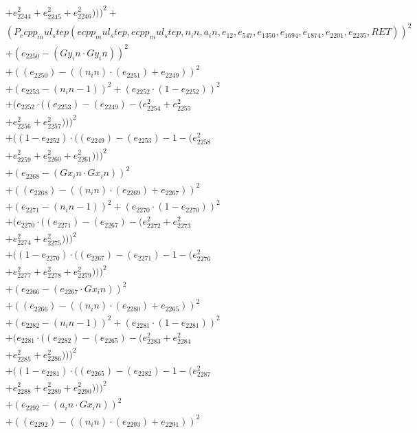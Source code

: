 \documentclass[10pt, a4paper]{article}
\begin{document}
\begin{small}
\begin{align*}
& + e_{2244}^{2} + e_{2245}^{2} + e_{2246}^{2})))^{2} + \\
& (P_ecpp_mul_step(ecpp_mul_step, ecpp_mul_step, n_in, a_in, e_{12}, e_{547}, e_{1350}, e_{1694}, e_{1874}, e_{2201}, e_{2235}, RET))^{2} \\
& + (e_{2250} - (Gy_in  \cdot  Gy_in))^{2} \\
& + ((e_{2250}) - ((n_in)  \cdot  (e_{2251}) + e_{2249}))^{2} \\
& + (e_{2253} - (n_in - 1))^{2} + (e_{2252}  \cdot  (1 - e_{2252}))^{2} \\
& + (e_{2252}  \cdot  ((e_{2253}) - (e_{2249}) - (e_{2254}^{2} + e_{2255}^{2} \\
& + e_{2256}^{2} + e_{2257}^{2})))^{2} \\
& + ((1 - e_{2252})  \cdot  ((e_{2249}) - (e_{2253}) - 1 - (e_{2258}^{2} \\
& + e_{2259}^{2} + e_{2260}^{2} + e_{2261}^{2})))^{2} \\
& + (e_{2268} - (Gx_in  \cdot  Gx_in))^{2} \\
& + ((e_{2268}) - ((n_in)  \cdot  (e_{2269}) + e_{2267}))^{2} \\
& + (e_{2271} - (n_in - 1))^{2} + (e_{2270}  \cdot  (1 - e_{2270}))^{2} \\
& + (e_{2270}  \cdot  ((e_{2271}) - (e_{2267}) - (e_{2272}^{2} + e_{2273}^{2} \\
& + e_{2274}^{2} + e_{2275}^{2})))^{2} \\
& + ((1 - e_{2270})  \cdot  ((e_{2267}) - (e_{2271}) - 1 - (e_{2276}^{2} \\
& + e_{2277}^{2} + e_{2278}^{2} + e_{2279}^{2})))^{2} \\
& + (e_{2266} - (e_{2267}  \cdot  Gx_in))^{2} \\
& + ((e_{2266}) - ((n_in)  \cdot  (e_{2280}) + e_{2265}))^{2} \\
& + (e_{2282} - (n_in - 1))^{2} + (e_{2281}  \cdot  (1 - e_{2281}))^{2} \\
& + (e_{2281}  \cdot  ((e_{2282}) - (e_{2265}) - (e_{2283}^{2} + e_{2284}^{2} \\
& + e_{2285}^{2} + e_{2286}^{2})))^{2} \\
& + ((1 - e_{2281})  \cdot  ((e_{2265}) - (e_{2282}) - 1 - (e_{2287}^{2} \\
& + e_{2288}^{2} + e_{2289}^{2} + e_{2290}^{2})))^{2} \\
& + (e_{2292} - (a_in  \cdot  Gx_in))^{2} \\
& + ((e_{2292}) - ((n_in)  \cdot  (e_{2293}) + e_{2291}))^{2} \\

\end{align*}
\end{small}
\end{document}
